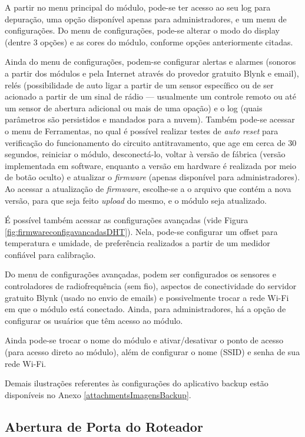 A partir no menu principal do módulo, pode-se ter acesso ao seu log para depuração, uma opção disponível apenas para administradores, e um menu de configurações. Do menu de configurações, pode-se alterar o modo do display (dentre 3 opções) e as cores do módulo, conforme opções anteriormente citadas.

Ainda do menu de configurações, podem-se configurar alertas e alarmes (sonoros a partir dos módulos e pela Internet através do provedor gratuito Blynk e email), relés (possibilidade de auto ligar a partir de um sensor específico ou de ser acionado a partir de um sinal de rádio --- usualmente um controle remoto ou até um sensor de abertura adicional ou mais de uma opação) e o log (quais parâmetros são persistidos e mandados para a nuvem). Também pode-se acessar o menu de Ferramentas, no qual é possível realizar testes de \emph{auto reset} para verificação do funcionamento do circuito antitravamento, que age em cerca de 30 segundos, reiniciar o módulo, desconectá-lo, voltar à versão de fábrica (versão implementada em software, enquanto a versão em hardware é realizada por meio de botão oculto) e atualizar o \emph{firmware} (apenas disponível para administradores).
Ao acessar a atualização de \emph{firmware}, escolhe-se a o arquivo que contém a nova versão, para que seja feito \emph{upload} do mesmo, e o módulo seja atualizado.

É possível também acessar as configurações avançadas (vide Figura \ref{fig:firmwareconfigavancadasDHT}). Nela, pode-se configurar um offset para temperatura e umidade, de preferência realizados a partir de um medidor confiável para calibração.

Do menu de configurações avançadas, podem ser configurados os sensores e controladores de radiofrequência (sem fio), aspectos de conectividade do servidor gratuito Blynk (usado no envio de emails) e possivelmente trocar a rede Wi-Fi em que o módulo está conectado. Ainda, para administradores, há a opção de configurar os usuários que têm acesso ao módulo.

Ainda pode-se trocar o nome do módulo e ativar/desativar o ponto de acesso (para acesso direto ao módulo), além de configurar o nome (SSID) e senha de sua rede Wi-Fi.

Demais ilustrações referentes às configurações do aplicativo backup estão disponíveis no Anexo \ref{attachmentsImagensBackup}{}.

\subsection{Abertura de Porta do Roteador}

